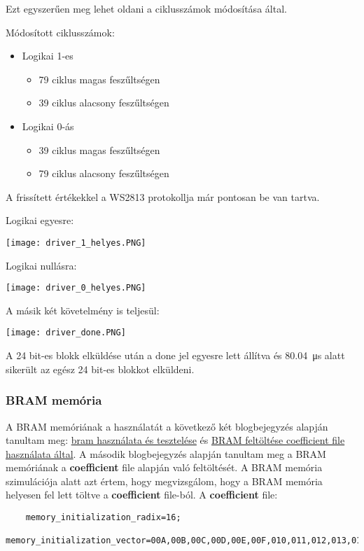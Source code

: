 \documentclass[10pt]{article} %
\begin{document}
Ezt egyszerűen meg lehet oldani a ciklusszámok módosítása által.

Módosított ciklusszámok:

\begin{itemize}
\item Logikai 1-es
	\begin{itemize}
	\item 79 ciklus magas feszűltségen
	\item 39 ciklus alacsony feszűltségen
	\end{itemize}
\item Logikai 0-ás
	\begin{itemize}
	\item 39 ciklus magas feszűltségen
	\item 79 ciklus alacsony feszűltségen
	\end{itemize}
\end{itemize}

A frissített értékekkel a WS2813 protokollja már pontosan be van tartva.

Logikai egyesre:

\texttt{[image: driver\_1\_helyes.PNG]}

Logikai nullásra:

\texttt{[image: driver\_0\_helyes.PNG]}

A másik két követelmény is teljesül:

\texttt{[image: driver\_done.PNG]}

A 24 bit-es blokk elküldése után a done jel egyesre lett állítva és \SI{80.04}{\micro\second} alatt sikerült az egész 24 bit-es blokkot elküldeni.

\subsubsection{BRAM memória}

A BRAM memóriának a használatát a következő két blogbejegyzés alapján tanultam meg: \href{http://vhdlguru.blogspot.com/2010/10/design-and-simulation-of-bram-using.html}{bram használata és tesztelése}
és \href{https://vhdlguru.blogspot.com/2010/10/how-to-use-coe-file-for-initializing.html}{BRAM feltöltése coefficient file használata által}.
A második blogbejegyzés alapján tanultam meg a BRAM memóriának a \textbf{coefficient} file alapján való feltöltését.
A BRAM memória szimulációja alatt azt értem, hogy megvizsgálom, hogy a BRAM memória helyesen fel lett töltve a \textbf{coefficient} file-ból.
A \textbf{coefficient} file:
\begin{verbatim}
	memory_initialization_radix=16;
	memory_initialization_vector=00A,00B,00C,00D,00E,00F,010,011,012,013,014,015,016,017,018,019;
\end{verbatim}
\end{document}
